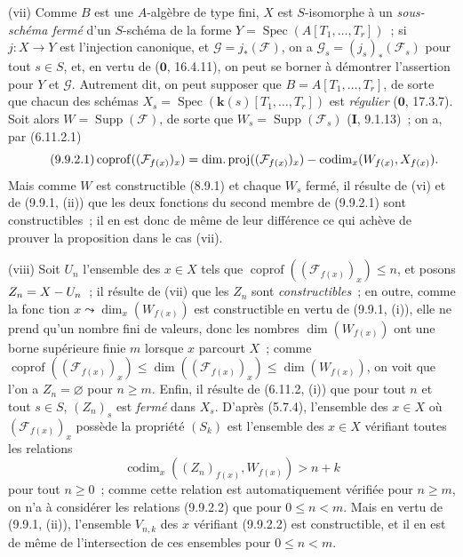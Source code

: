 (vii) Comme $B$ est une $A$-algèbre de type fini, $X$ est $S$-isomorphe à un
\emph{sous-schéma fermé} d'un $S$-schéma de la forme
$Y=\operatorname{Spec}(A[T_1,\ldots,T_r])$~; si $j:X\to Y$ est l'injection
canonique, et $\mathcal G=j_*(\mathcal F)$, on a
$\mathcal G_s=(j_s)_*(\mathcal F_s)$ pour tout $s\in S$, et, en vertu de
($\mathbf 0$, 16.4.11), on peut se borner à démontrer l'assertion pour $Y$ et
$\mathcal G$. Autrement dit, on peut supposer que $B=A[T_1,\ldots,T_r]$, de
sorte que chacun des schémas $X_s=\operatorname{Spec}(\boldsymbol{k}(s)[T_1,\ldots,T_r])$
est \emph{régulier} ($\mathbf 0$, 17.3.7). Soit alors
$W=\operatorname{Supp}(\mathcal F)$, de sorte que
$W_s=\operatorname{Supp}(\mathcal F_s)$ (\textbf{I}, 9.1.13)~; on a, par
(6.11.2.1)
\begin{equation}
\tag{9.9.2.1}
\label{IV.9.9.2.1-fr}
\operatorname{coprof}((\mathcal F_{f(x)})_x)=
\operatorname{dim.proj}((\mathcal F_{f(x)})_x)-
\operatorname{codim}_x(W_{f(x)},X_{f(x)}).
\end{equation}
Mais comme $W$ est constructible (8.9.1) et chaque $W_s$ fermé, il résulte de
(vi) et de (9.9.1, (ii)) que les deux fonctions du second membre de (9.9.2.1)
sont constructibles~; il en est donc de même de leur différence ce qui achève
de prouver la proposition dans le cas (vii).

(viii) Soit $U_n$ l'ensemble des $x\in X$ tels que
$\operatorname{coprof}((\mathcal F_{f(x)})_x)\leq n$, et posons
$Z_n=X- U_n$~; il résulte de (vii) que les $Z_n$ sont \emph{constructibles}~; en outre,
comme
la fonc%
tion $x\leadsto\dim_x(W_{f(x)})$ est constructible en vertu de
(9.9.1, (i)), elle ne prend qu'un nombre fini de valeurs, donc les nombres
$\dim(W_{f(x)})$ ont une borne supérieure finie $m$ lorsque $x$ parcourt $X$~;
comme
$\operatorname{coprof}((\mathcal F_{f(x)})_x)\leq
\dim((\mathcal F_{f(x)})_x)\leq\dim(W_{f(x)})$, on voit que l'on a
$Z_n=\varnothing$ pour $n\geq m$. Enfin, il résulte de (6.11.2, (i)) que pour
tout $n$ et tout $s\in S$, $(Z_n)_s$ est \emph{fermé} dans $X_s$. D'après
(5.7.4), l'ensemble des $x\in X$ où $(\mathcal F_{f(x)})_x$ possède la
propriété $(S_k)$ est l'ensemble des $x\in X$ vérifiant toutes les relations
\begin{equation}
\tag{9.9.2.2}
\label{IV.9.9.2.2-fr}
\operatorname{codim}_x((Z_n)_{f(x)},W_{f(x)})>n+k
\end{equation}
pour tout $n\geq0$~; comme cette relation est automatiquement vérifiée pour
$n\geq m$, on n'a à considérer les relations (9.9.2.2) que pour $0\leq n<m$.
Mais en vertu de (9.9.1, (ii)), l'ensemble $V_{n,k}$ des $x$ vérifiant (9.9.2.2)
est constructible, et il en est de même de l'intersection de ces ensembles pour
$0\leq n<m$.

